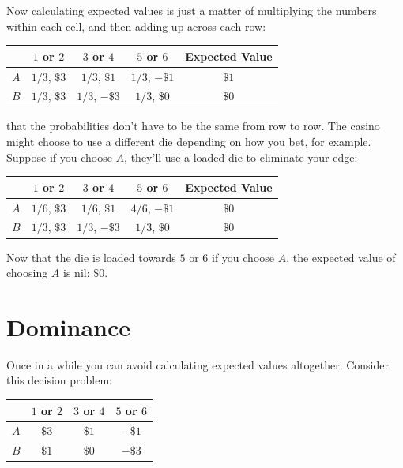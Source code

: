 \documentclass[justified]{tufte-book}
\theoremstyle{definition}
\theoremstyle{definition}
\theoremstyle{definition}
\theoremstyle{definition}
\theoremstyle{remark}
\begin{document}
Now calculating expected values is just a matter of multiplying the numbers within each cell, and then adding up across each row:

\begin{longtable}[]{@{}lcccc@{}}
\toprule
& \(1\) or \(2\) & \(3\) or \(4\) & \(5\) or \(6\) & Expected Value \\
\midrule
\endhead
\(A\) & \(1/3\), \(\$3\) & \(1/3\), \(\$1\) & \(1/3\), \(-\$1\) & \(\$1\) \\
\(B\) & \(1/3\), \(\$3\) & \(1/3\), \(-\$3\) & \(1/3\), \(\$0\) & \(\$0\) \\
\bottomrule
\end{longtable}

 that the probabilities don't have to be the same from row to row. The casino might choose to use a different die depending on how you bet, for example. Suppose if you choose \(A\), they'll use a loaded die to eliminate your edge:

\begin{longtable}[]{@{}lcccc@{}}
\toprule
& \(1\) or \(2\) & \(3\) or \(4\) & \(5\) or \(6\) & Expected Value \\
\midrule
\endhead
\(A\) & \(1/6\), \(\$3\) & \(1/6\), \(\$1\) & \(4/6\), \(-\$1\) & \(\$0\) \\
\(B\) & \(1/3\), \(\$3\) & \(1/3\), \(-\$3\) & \(1/3\), \(\$0\) & \(\$0\) \\
\bottomrule
\end{longtable}

Now that the die is loaded towards \(5\) or \(6\) if you choose \(A\), the expected value of choosing \(A\) is nil: \(\$0\).

\hypertarget{dominance}{%
\section{Dominance}\label{dominance}}

Once in a while you can avoid calculating expected values altogether. Consider this decision problem:

\begin{longtable}[]{@{}lccc@{}}
\toprule
& \(1\) or \(2\) & \(3\) or \(4\) & \(5\) or \(6\) \\
\midrule
\endhead
\(A\) & \(\$3\) & \(\$1\) & \(-\$1\) \\
\(B\) & \(\$1\) & \(\$0\) & \(-\$3\) \\
\bottomrule
\end{longtable}
\end{document}
